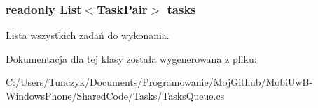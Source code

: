 \subsubsection[{tasks}]{\setlength{\rightskip}{0pt plus 5cm}readonly List$<$Task\+Pair$>$ tasks\hspace{0.3cm}{\ttfamily [private]}}\label{a00069_aba8a25f7d9693b07797af93611282242}


Lista wszystkich zadań do wykonania. 



Dokumentacja dla tej klasy została wygenerowana z pliku\+:\begin{DoxyCompactItemize}
\item 
C\+:/\+Users/\+Tunczyk/\+Documents/\+Programowanie/\+Moj\+Github/\+Mobi\+Uw\+B-\/\+Windows\+Phone/\+Shared\+Code/\+Tasks/Tasks\+Queue.\+cs\end{DoxyCompactItemize}

